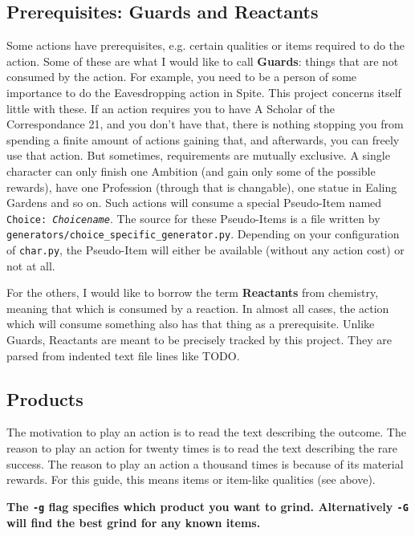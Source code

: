 \documentclass[a4paper,11pt,openright,twoside]{scrartcl}
\begin{document}
\subsection{Prerequisites: Guards and Reactants}

Some actions have prerequisites, e.g. certain qualities or items required to do the action. Some of these are what I would like to call \textbf{Guards}: things that are not consumed by the action. For example, you need to be a person of some importance to do the Eavesdropping action in Spite. This project concerns itself little with these. If an action requires you to have A Scholar of the Correspondance 21, and you don't have that, there is nothing stopping you from spending a finite amount of actions gaining that, and afterwards, you can freely use that action. But sometimes, requirements are mutually exclusive. A single character can only finish one Ambition (and gain only some of the possible rewards), have one Profession (through that is changable), one statue in Ealing Gardens and so on. Such actions will consume a special Pseudo-Item named \texttt{Choice: \emph{Choicename}}. The source for these Pseudo-Items is a file written by \texttt{generators/choice\_specific\_generator.py}. Depending on your configuration of \texttt{char.py}, the Pseudo-Item will either be available (without any action cost) or not at all. 

For the others, I would like to borrow the term \textbf{Reactants} from chemistry, meaning that which is consumed by a reaction. In almost all cases, the action which will consume something also has that thing as a prerequisite. Unlike Guards, Reactants are meant to be precisely tracked by this project. They are parsed from indented text file lines like TODO.

\subsection{Products}

The motivation to play an action is to read the text describing the outcome. The  reason to play an action for twenty times is to read the text describing the rare success. The reason to play an action a thousand times is because of its material rewards. For this guide, this means items or item-like qualities (see above). 

\textbf{The \texttt{-g} flag specifies which product you want to grind. Alternatively \texttt{-G} will find the best grind for any known items.}
\end{document}
